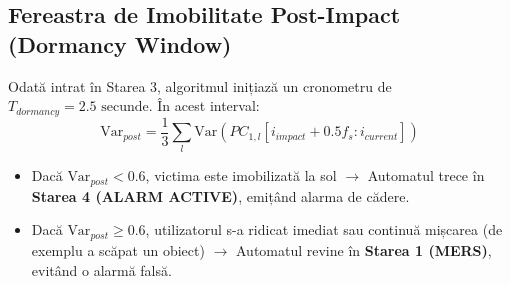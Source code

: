 \subsection{Fereastra de Imobilitate Post-Impact (Dormancy Window)}
Odată intrat în Starea 3, algoritmul inițiază un cronometru de $T_{dormancy} = 2.5\text{ secunde}$. În acest interval:
\begin{equation}
    \text{Var}_{post} = \frac{1}{3} \sum_{l} \text{Var}\left(PC_{1, l}[i_{impact} + 0.5 f_s : i_{current}]\right)
\end{equation}
\begin{itemize}
    \item Dacă $\text{Var}_{post} < 0.6$, victima este imobilizată la sol $\rightarrow$ Automatul trece în \textbf{Starea 4 (ALARM ACTIVE)}, emițând alarma de cădere.
    \item Dacă $\text{Var}_{post} \ge 0.6$, utilizatorul s-a ridicat imediat sau continuă mișcarea (de exemplu a scăpat un obiect) $\rightarrow$ Automatul revine în \textbf{Starea 1 (MERS)}, evitând o alarmă falsă.
\end{itemize}
